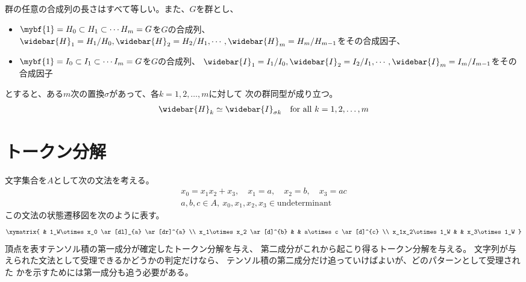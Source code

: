 	\begin{proposition}\label{prop:Jordan-Holderの定理} %
		群の任意の合成列の長さはすべて等しい。また、$G$を群とし、
		\begin{itemize}\setlength{\itemsep}{-1mm} %
			\item $\mybf{1}=H_0\subset H_1\subset\cdots H_m=G$を$G$の合成列、
			$\widebar{H}_1=H_1/H_0,\widebar{H}_2=H_2/H_1,\cdots,
			\widebar{H}_m=H_m/H_{m-1}$をその合成因子、
			\item $\mybf{1}=I_0\subset I_1\subset\cdots I_m=G$を$G$の合成列、
			$\widebar{I}_1=I_1/I_0,\widebar{I}_2=I_2/I_1,\cdots,
			\widebar{I}_m=I_m/I_{m-1}$をその合成因子
		\end{itemize} %
		とすると、ある$m$次の置換$\sigma$があって、各$k=1,2,\dots,m$に対して
		次の群同型が成り立つ。
		\begin{equation*}\begin{split} %
			\widebar{H}_k \simeq \widebar{I}_{\sigma k}
			\quad\text{for all }k=1,2,\dots,m
		\end{split}\end{equation*} %
	\end{proposition} %

\section{トークン分解}\label{s1:トークン分解} %
	文字集合を$A$として次の文法を考える。
	\begin{equation}\label{eq:トークン分解その一}\begin{split} %
		x_0 = x_1x_2 + x_3,\quad x_1 = a,\quad  x_2 = b,\quad  x_3 = ac \\ 
		a,b,c\in A,\:x_0,x_1,x_2,x_3\in \text{undeterminant}
	\end{split}\end{equation} %
	この文法の状態遷移図を次のように表す。
	\begin{equation*}\xymatrix{
		& 1_W\otimes x_0 \ar[dl]_{a} \ar[dr]^{a} \\
		x_1\otimes x_2 \ar[d]^{b} & & a\otimes c \ar[d]^{c} \\
		x_1x_2\otimes 1_W  & &  x_3\otimes 1_W
	}\end{equation*}
	頂点を表すテンソル積の第一成分が確定したトークン分解を与え、
	第二成分がこれから起こり得るトークン分解を与える。
	文字列が与えられた文法として受理できるかどうかの判定だけなら、
	テンソル積の第二成分だけ追っていけばよいが、どのパターンとして受理された
	かを示すためには第一成分も追う必要がある。


